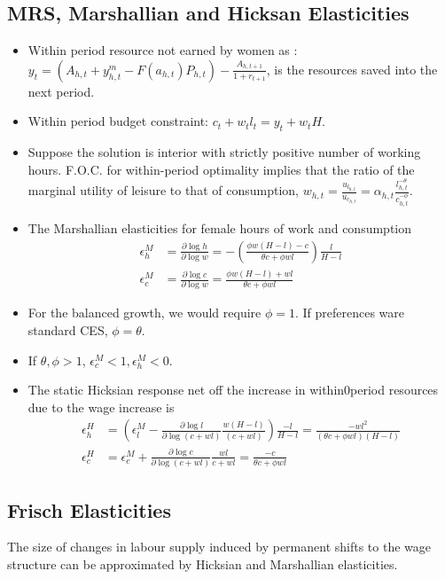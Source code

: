 \subsection{MRS, Marshallian and Hicksan Elasticities}
\begin{itemize}
    \item  Within period resource not earned by women as : $y_t = (A_{h,t} + y_{h,t}^m - F(a_{h,t}) P_{h,t}) - \frac{A_{h,t+1}}{1 + r_{t+1}}$, is the resources saved into the next period.
     \item Within period budget constraint: $c_t + w_t l_t = y_t + w_t H$. 
     \item Suppose the solution is interior with strictly positive number of working hours. F.O.C. for within-period optimality implies that the ratio of the marginal utility of leisure to that of consumption,
     $w_{h,t} = \frac{u_{l_{h,t}}}{u_{c_{h,t}}} = \alpha_{h,t} \frac{l_{h,t}^{-\theta}}{c_{h,t}^{-\phi}}$.
     \item The Marshallian elasticities for female hours of work and consumption \[ \begin{split}
      \epsilon_h^M & = \frac{\partial \log h}{\partial \log w} = - \left( \frac{\phi w (H-l) - c}{\theta c + \phi w l} \right) \frac{l}{H - l } \\
      \epsilon_c^M & = \frac{\partial \log c}{\partial \log w} = \frac{\phi w (H-l) + wl}{\theta c + \phi w l} \end{split}\]
      \item For the balanced growth, we would require $\phi = 1$. If preferences ware standard CES, $\phi = \theta$.\item If $\theta,\phi > 1$, $\epsilon^M_c < 1,\epsilon_h^M <  0 $.
      \item The static Hicksian response net off the increase in within0period resources due to the wage increase is \[ \begin{split}
          \epsilon_h^H & = \left(\epsilon_l^M - \frac{\partial \log l }{\partial \log (c+wl)} \frac{w(H-l)}{(c+wl)}\right)\frac{-l}{H-l} = \frac{-wl^2}{(\theta c + \phi w l )(H - l)} \\
          \epsilon_c^H & = \epsilon_c^M + \frac{\partial \log c}{\partial \log (c+wl)} \frac{wl}{c+wl} = \frac{-c}{\theta c  + \phi wl} 
      \end{split} \]
\end{itemize}

\subsection{Frisch Elasticities}
The size of changes in labour supply induced by permanent shifts to the wage structure can be approximated by Hicksian and Marshallian elasticities.

